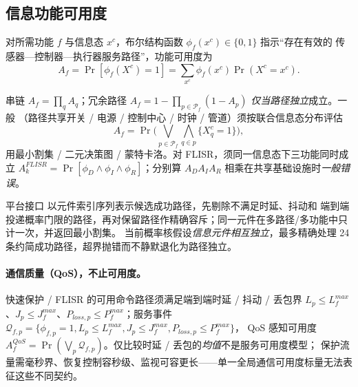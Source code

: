\subsection{信息功能可用度}\label{sec:rel-icp-avail}
对所需功能 $f$ 与信息态 $x^c$，布尔结构函数 $\phi_f(x^c)\in\{0,1\}$ 指示“存在有效的
传感器—控制器—执行器服务路径”，功能可用度为
\begin{equation}
 A_f=\Pr[\phi_f(X^c)=1]=\sum_{x^c}\phi_f(x^c)\Pr(X^c=x^c).
\end{equation}

\begin{proposition}[路径结构与独立性陷阱]\label{prop:rel-icp-path}
串链 $A_f=\prod_qA_q$；冗余路径 $A_f=1-\prod_{p\in\mathcal P_f}(1-A_p)$ \emph{仅当路径独立}成立。一般
（路径共享开关 / 电源 / 控制中心 / 时钟 / 管道）须按联合信息态分布评估
\begin{equation}
 A_f=\Pr\!\Big(\bigvee_{p\in\mathcal P_f}\bigwedge_{q\in p}\{X_q^c=1\}\Big),
\end{equation}
用最小割集 / 二元决策图 / 蒙特卡洛。对 FLISR，须同一信息态下三功能同时成立
$A_k^{FLISR}=\Pr[\phi_D\land\phi_I\land\phi_R]$；分别算 $A_DA_IA_R$ 相乘在共享基础设施时\emph{一般错误}。
\end{proposition}
平台接口  以元件索引序列表示候选成功路径，先剔除不满足时延、抖动和
端到端投递概率门限的路径，再对保留路径作精确容斥；同一元件在多路径/多功能中只计一次，并返回最小割集。
当前概率核假设\emph{信息元件相互独立}，最多精确处理 24 条约简成功路径，超界抛错而不静默退化为路径独立。

\paragraph{通信质量（QoS），不止可用度。}
快速保护 / FLISR 的可用命令路径须满足端到端时延 / 抖动 / 丢包界
$L_p\le L_f^{max}$、$J_p\le J_f^{max}$、$P_{loss,p}\le P_f^{max}$；服务事件
$\mathcal Q_{f,p}=\{\phi_{f,p}{=}1,L_p{\le}L_f^{max},J_p{\le}J_f^{max},P_{loss,p}{\le}P_f^{max}\}$，
QoS 感知可用度 $A_f^{QoS}=\Pr(\bigvee_p\mathcal Q_{f,p})$。仅比较时延 / 丢包的\emph{均值}不是服务可用度模型；
保护流量需毫秒界、恢复控制容秒级、监视可容更长——单一全局通信可用度标量无法表征这些不同契约。


